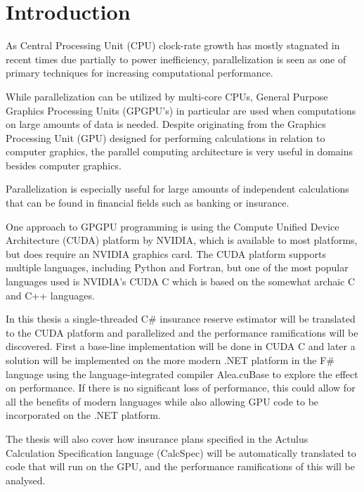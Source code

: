\section{Introduction}
As Central Processing Unit (CPU) clock-rate growth has mostly stagnated in recent times due partially to power inefficiency\cite{ross2008cpu}, parallelization is seen as one of primary techniques for increasing computational performance.

While parallelization can be utilized by multi-core CPUs, General Purpose Graphics Processing Units (GPGPU's) in particular are used when computations on large amounts of data is needed. Despite originating from the Graphics Processing Unit (GPU) designed for performing calculations in relation to computer graphics, the parallel computing architecture is very useful in domains besides computer graphics.

Parallelization is especially useful for large amounts of independent calculations that can be found in financial fields such as banking or insurance.

One approach to GPGPU programming is using the Compute Unified Device Architecture (CUDA) platform by NVIDIA, which is available to most platforms, but does require an NVIDIA graphics card.
The CUDA platform supports multiple languages, including Python and Fortran, but one of the most popular languages used is NVIDIA's CUDA C which is based on the somewhat archaic C and C++ languages.

In this thesis a single-threaded C\# insurance reserve estimator will be translated to the CUDA platform and parallelized and the performance ramifications will be discovered.
First a base-line implementation will be done in CUDA C and later a solution will be implemented on the more modern .NET platform in the F\# language using the language-integrated compiler Alea.cuBase to explore the effect on performance.
If there is no significant loss of performance, this could allow for all the benefits of modern languages while also allowing GPU code to be incorporated on the .NET platform.


The thesis will also cover how insurance plans specified in the Actulus Calculation Specification language (CalcSpec) will be automatically translated to code that will run on the GPU, and the performance ramifications of this will be analysed.

